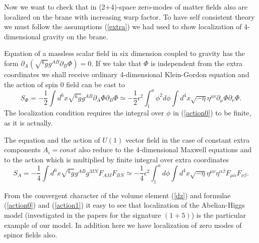 \documentclass[a4paper,a4paper]{article}
\begin{document}
Now we want to check that in (2+4)-space zero-modes of matter
fields also are localized on the brane with increasing warp
factor. To have self consistent theory we must follow the
assumptions (\ref{extra}) we had used to show localization of
4-dimensional gravity on the brane.

Equation of a massless scalar field in six dimension coupled to
gravity has the form $\partial _A (\sqrt{^6g}g^{AB}\partial_B \Phi
) = 0$. If we take that $\Phi$ is independent from the extra
coordinates we shall receive ordinary 4-dimensional Klein-Gordon
equation and the action of spin $0$ field can be cast to
\begin{equation} \label{action0}
S_\Phi = -\frac{1}{2} \int d^6x \sqrt{^6g}g^{AB}\partial _A \Phi
\partial _B \Phi \simeq -\frac{1}{2} \epsilon^2 \int_1^a
\phi^2d\phi \int d^4x \sqrt{-\eta}\eta^{\mu\nu}\partial _\mu
\Phi\partial _\nu \Phi.
\end{equation}
The localization condition requires the integral over $\phi $ in
(\ref{action0}) to be finite, as it is actually.

The equation and the action of $U(1)$ vector field in the case of
constant extra components $A_i = const $ also reduce to the
4-dimensional Maxwell equations and to the action which is
multiplied by finite integral over extra coordinates
\begin{equation} \label{action1}
S_A = -\frac{1}{4} \int d^6x \sqrt{^6g}g^{AB} g^{MN}F_{AM}F_{BN}
\simeq -\frac{1}{4} \epsilon^2 \int_1^a d\phi \int d^4x
\sqrt{-\eta}\eta^{\mu\nu}\eta^{\alpha\beta}F_{\mu\alpha}F_{\nu\beta}.
\end{equation}

From the convergent character of the volume element (\ref{dz}) and 
formulae (\ref{action0}) and (\ref{action1}) it easy to see that 
localization of the Abelian-Higgs model (investigated in the papers 
\cite{GiMeSh,Gi} for the signature $(1+5)$) is the particular example 
of our model. In addition here we have localization of zero modes of 
spinor fields also.
\end{document}
